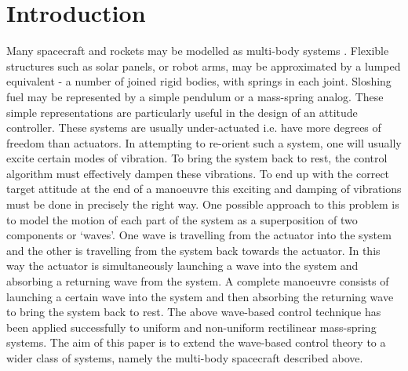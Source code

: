\documentclass{mbd_fullpaper}
\begin{document}
\section{Introduction}
Many spacecraft and rockets may be modelled as multi-body systems \cite{kane}.
Flexible structures such as solar panels, or robot arms, may be approximated by a lumped equivalent - a number of joined rigid bodies, with springs in each joint.
Sloshing fuel may be represented by a simple pendulum or a mass-spring analog.
These simple representations are particularly useful in the design of an attitude controller.
These systems are usually under-actuated i.e. have more degrees of freedom than actuators.
In attempting to re-orient such a system, one will usually excite certain modes of vibration.
To bring the system back to rest, the control algorithm must effectively dampen these vibrations.
To end up with the correct target attitude at the end of a manoeuvre this exciting and damping of vibrations must be done in precisely the right way.
One possible approach to this problem is to model the motion of each part of the system as a superposition of two components or `waves'.
One wave is travelling from the actuator into the system and the other is travelling from the system back towards the actuator.
In this way the actuator is simultaneously launching a wave into the system and absorbing a returning wave from the system.
A complete manoeuvre consists of launching a certain wave into the system and then absorbing the returning wave to bring the system back to rest.
The above wave-based control technique has been applied successfully to uniform and non-uniform rectilinear mass-spring systems.
The aim of this paper is to extend the wave-based control theory to a wider class of systems, namely the multi-body spacecraft described above. 
\end{document}
